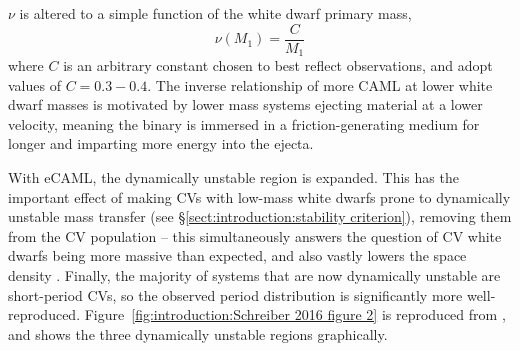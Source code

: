 $\nu$ is altered to a simple function of the white dwarf primary mass,
\begin{equation}
    \label{eqn:introduction:eCAML nu}
    \nu (M_1) = \frac{C}{M_1}
\end{equation}
where $C$ is an arbitrary constant chosen to best reflect observations, and \citep{Schreiber2016} adopt values of $C = 0.3 - 0.4$. 
The inverse relationship of more CAML at lower white dwarf masses is motivated by lower mass systems ejecting material at a lower velocity, meaning the binary is immersed in a friction-generating medium for longer and imparting more energy into the ejecta. 

With eCAML, the dynamically unstable region is expanded. This has the important effect of making CVs with low-mass white dwarfs prone to dynamically unstable mass transfer (see \S\ref{sect:introduction:stability criterion}), removing them from the CV population -- this simultaneously answers the question of CV white dwarfs being more massive than expected, and also vastly lowers the space density \citep{belloni2018}. Finally, the majority of systems that are now dynamically unstable are short-period CVs, so the observed period distribution is significantly more well-reproduced. Figure~\ref{fig:introduction:Schreiber 2016 figure 2} is reproduced from \citet{Schreiber2016}, and shows the three dynamically unstable regions graphically.
